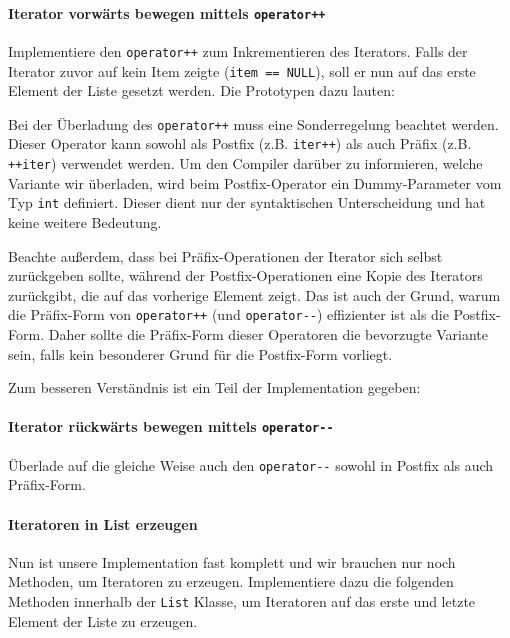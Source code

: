 

\paragraph{Iterator vorwärts bewegen mittels \lstinline{operator++}}

Implementiere den \lstinline{operator++} zum Inkrementieren des Iterators.
Falls der Iterator zuvor auf kein Item zeigte (\lstinline{item == NULL}), soll er nun auf das erste Element der Liste gesetzt werden.
Die Prototypen dazu lauten:



Bei der Überladung des \lstinline{operator++} muss eine Sonderregelung beachtet werden.
Dieser Operator kann sowohl als Postfix (z.B. \lstinline{iter++}) als auch Präfix (z.B. \lstinline{++iter}) verwendet werden.
Um den Compiler darüber zu informieren, welche Variante wir überladen, wird beim Postfix-Operator ein Dummy-Parameter vom Typ \lstinline{int} definiert.
Dieser dient nur der syntaktischen Unterscheidung und hat keine weitere Bedeutung.

Beachte außerdem, dass bei Präfix-Operationen der Iterator sich selbst zurückgeben sollte, während der Postfix-Operationen eine Kopie des Iterators zurückgibt, die auf das vorherige Element zeigt.
Das ist auch der Grund, warum die Präfix-Form von \lstinline{operator++} (und \lstinline{operator--}) effizienter ist als die Postfix-Form.
Daher sollte die Präfix-Form dieser Operatoren die bevorzugte Variante sein, falls kein besonderer Grund für die Postfix-Form vorliegt.

Zum besseren Verständnis ist ein Teil der Implementation gegeben:



\paragraph{Iterator rückwärts bewegen mittels \lstinline{operator--}}
Überlade auf die gleiche Weise auch den \lstinline{operator--} sowohl in Postfix als auch Präfix-Form.

\paragraph{Iteratoren in List erzeugen} 
Nun ist unsere Implementation fast komplett und wir brauchen nur noch Methoden, um Iteratoren zu erzeugen.
Implementiere dazu die folgenden Methoden innerhalb der \lstinline{List} Klasse, um Iteratoren auf das erste und letzte Element der Liste zu erzeugen.

